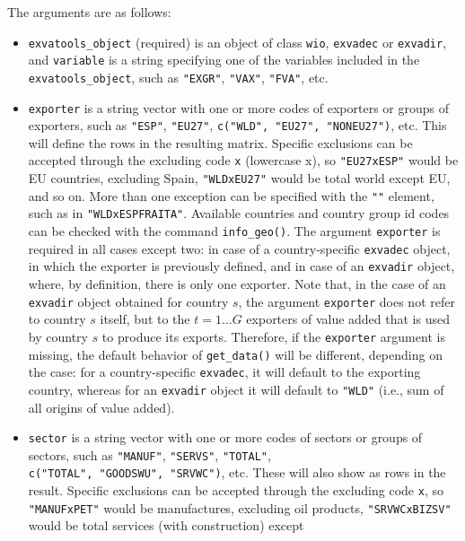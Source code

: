 The arguments are as follows:

\begin{itemize}
\tightlist
\item
  \texttt{exvatools\_object} (required) is an object of class \texttt{wio}, \texttt{exvadec} or
  \texttt{exvadir}, and \texttt{variable} is a string specifying one of the variables included
  in the \texttt{exvatools\_object}, such as \texttt{"EXGR"}, \texttt{"VAX"}, \texttt{"FVA"}, etc.
\item
  \texttt{exporter} is a string vector with one or more codes of exporters or groups of
  exporters, such as \texttt{"ESP"}, \texttt{"EU27"}, \texttt{c("WLD",\ "EU27",\ "NONEU27")}, etc. This
  will define the rows in the resulting matrix. Specific exclusions can be
  accepted through the excluding code \texttt{x} (lowercase x), so \texttt{"EU27xESP"} would
  be EU countries, excluding Spain, \texttt{"WLDxEU27"} would be total world except EU,
  and so on. More than one exception can be specified with the \texttt{"\textbar{}"} element,
  such as in \texttt{"WLDxESP\textbar{}FRA\textbar{}ITA"}. Available countries and country group id codes
  can be checked with the command \texttt{info\_geo()}. The argument \texttt{exporter} is
  required in all cases except two: in case of a country-specific \texttt{exvadec}
  object, in which the exporter is previously defined, and in case of an
  \texttt{exvadir} object, where, by definition, there is only one exporter. Note that,
  in the case of an \texttt{exvadir} object obtained for country \(s\), the argument
  \texttt{exporter} does not refer to country \(s\) itself, but to the \(t = 1 \dots G\)
  exporters of value added that is used by country \(s\) to produce its exports.
  Therefore, if the \texttt{exporter} argument is missing, the default behavior of
  \texttt{get\_data()} will be different, depending on the case: for a country-specific
  \texttt{exvadec}, it will default to the exporting country, whereas for an \texttt{exvadir}
  object it will default to \texttt{"WLD"} (i.e., sum of all origins of value added).
\item
  \texttt{sector} is a string vector with one or more codes of sectors or groups
  of sectors, such as \texttt{"MANUF"}, \texttt{"SERVS"}, \texttt{"TOTAL"},
  \texttt{c("TOTAL",\ "GOODSWU",\ "SRVWC")}, etc. These will also show as rows in
  the result. Specific exclusions can be accepted through the excluding code
  \texttt{x}, so \texttt{"MANUFxPET"} would be manufactures, excluding oil products,
  \texttt{"SRVWCxBIZSV"} would be total services (with construction) except

\end{itemize}
